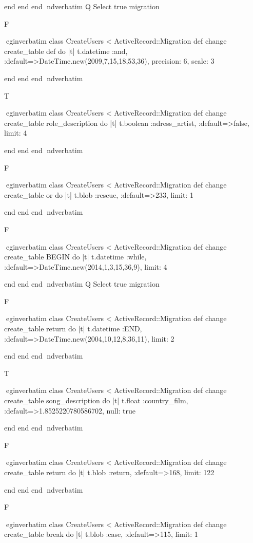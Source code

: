     end 
  end 
end
nd{verbatim}
Q
 Select true migration

F

egin{verbatim}
 class CreateUsers < ActiveRecord::Migration 
  def change 
    create_table def do |t| 
      t.datetime :and, :default=>DateTime.new(2009,7,15,18,53,36), precision: 6, scale: 3
    
    end 
  end 
end
nd{verbatim}

T

egin{verbatim}
 class CreateUsers < ActiveRecord::Migration 
  def change 
    create_table role_description do |t| 
      t.boolean :adress_artist, :default=>false, limit: 4
    
    end 
  end 
end
nd{verbatim}

F

egin{verbatim}
 class CreateUsers < ActiveRecord::Migration 
  def change 
    create_table or do |t| 
      t.blob :rescue, :default=>233, limit: 1
    
    end 
  end 
end
nd{verbatim}

F

egin{verbatim}
 class CreateUsers < ActiveRecord::Migration 
  def change 
    create_table BEGIN do |t| 
      t.datetime :while, :default=>DateTime.new(2014,1,3,15,36,9), limit: 4
    
    end 
  end 
end
nd{verbatim}
Q
 Select true migration

F

egin{verbatim}
 class CreateUsers < ActiveRecord::Migration 
  def change 
    create_table return do |t| 
      t.datetime :END, :default=>DateTime.new(2004,10,12,8,36,11), limit: 2
    
    end 
  end 
end
nd{verbatim}

T

egin{verbatim}
 class CreateUsers < ActiveRecord::Migration 
  def change 
    create_table song_description do |t| 
      t.float :country_film, :default=>1.8525220780586702, null: true
    
    end 
  end 
end
nd{verbatim}

F

egin{verbatim}
 class CreateUsers < ActiveRecord::Migration 
  def change 
    create_table return do |t| 
      t.blob :return, :default=>168, limit: 122
    
    end 
  end 
end
nd{verbatim}

F

egin{verbatim}
 class CreateUsers < ActiveRecord::Migration 
  def change 
    create_table break do |t| 
      t.blob :case, :default=>115, limit: 1
    
